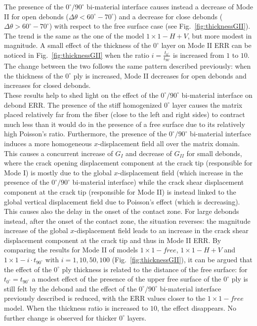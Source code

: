 \documentclass[review]{elsarticle}
\begin{document}
The presence of the $0^{\circ}/90^{\circ}$ bi-material interface causes instead a decrease of Mode II for open debonds ($\Delta\theta<60^{\circ}-70^{\circ}$) and a decrease for close debonds ($\Delta\theta>60^{\circ}-70^{\circ}$) with respect to the free surface case (see Fig.~\ref{fig:thicknessGII}). The trend is the same as the one of the model $1\times 1-H+V$, but more modest in magnitude. A small effect of the thickness of the $0^{\circ}$ layer on Mode II ERR can be noticed in Fig.~\ref{fig:thicknessGII} when the ratio $i=\frac{t_{0^{\circ}}}{t_{90^{\circ}}}$ is increased from $1$ to $10$. The change between the two follows the same pattern described previously: when the thickness of the $0^{\circ}$ ply is increased, Mode II decreases for open debonds and increases for closed debonds.\\
These results help to shed light on the effect of the $0^{\circ}/90^{\circ}$ bi-material interface on debond ERR. The presence of the stiff homogenized $0^{\circ}$ layer causes the matrix placed relatively far from the fiber (close to the left and right sides) to contract much less than it would do in the presence of a free surface due to its relatively high Poisson's ratio. Furthermore, the presence of the $0^{\circ}/90^{\circ}$ bi-material interface induces a more homogeneous $x$-displacement field all over the matrix domain. This causes a concurrent increase of $G_{I}$ and decrease of $G_{II}$ for small debonds, where the crack opening displacement component at the crack tip (responsible for Mode I) is mostly due to the global $x$-displacement field (which increase in the presence of the $0^{\circ}/90^{\circ}$ bi-material interface) while the crack shear displacement component at the crack tip (responsible for Mode II) is instead linked to the global vertical displacement field due to Poisson's effect (which is decreasing). This causes also the delay in the onset of the contact zone. For large debonds instead, after the onset of the contact zone, the situation reverses: the magnitude increase of the global $x$-displacement field leads to an increase in the crack shear displacement component at the crack tip and thus in Mode II ERR. By comparing the results for Mode II of models $1\times 1-free$, $1\times 1-H+V$ and $1\times 1-i\cdot t_{90^{\circ}}$ with $i=1,10,50,100$ (Fig.~\ref{fig:thicknessGII}), it can be argued that the effect of the $0^{\circ}$ ply thickness is related to the distance of the free surface: for $t_{0^{\circ}}=t_{90^{\circ}}$ a modest effect of the presence of the upper free surface of the $0^{\circ}$ ply is still felt by the debond and the effect of the $0^{\circ}/90^{\circ}$ bi-material interface previously described is reduced, with the ERR values closer to the $1\times 1-free$ model. When the thickness ratio is increased to $10$, the effect disappears. No further change is observed for thicker $0^{\circ}$ layers. 
\end{document}
